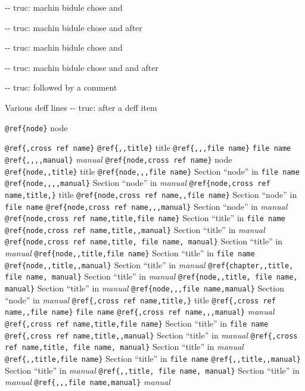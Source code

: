 \documentclass{book}
\begin{document}
\hbox{}{-}{-} truc: machin bidule chose and


%
\hbox{}{-}{-} truc: machin bidule chose and  after


%
\hbox{}{-}{-} truc: machin bidule chose and 


%
\hbox{}{-}{-} truc: machin bidule chose and and after


%
\hbox{}{-}{-} truc: followed by a comment


%
Various deff lines
\hbox{}{-}{-} truc: after a deff item


%

\texttt{@ref\{node\}} node

\texttt{@ref\{,cross ref name\}} 
\texttt{@ref\{,,title\}} title
\texttt{@ref\{,,,file name\}} \texttt{file name}
\texttt{@ref\{,,,,manual\}} \textit{manual}
\texttt{@ref\{node,cross ref name\}} node
\texttt{@ref\{node,,title\}} title
\texttt{@ref\{node,,,file name\}} Section ``node'' in \texttt{file name}
\texttt{@ref\{node,,,,manual\}} Section ``node'' in \textit{manual}
\texttt{@ref\{node,cross ref name,title,\}} title
\texttt{@ref\{node,cross ref name,,file name\}} Section ``node'' in \texttt{file name}
\texttt{@ref\{node,cross ref name,,,manual\}} Section ``node'' in \textit{manual}
\texttt{@ref\{node,cross ref name,title,file name\}} Section ``title'' in \texttt{file name}
\texttt{@ref\{node,cross ref name,title,,manual\}} Section ``title'' in \textit{manual}
\texttt{@ref\{node,cross ref name,title, file name, manual\}} Section ``title'' in \textit{manual}
\texttt{@ref\{node,,title,file name\}} Section ``title'' in \texttt{file name}
\texttt{@ref\{node,,title,,manual\}} Section ``title'' in \textit{manual}
\texttt{@ref\{chapter,,title, file name, manual\}} Section ``title'' in \textit{manual}
\texttt{@ref\{node,,title, file name, manual\}} Section ``title'' in \textit{manual}
\texttt{@ref\{node,,,file name,manual\}} Section ``node'' in \textit{manual}
\texttt{@ref\{,cross ref name,title,\}} title
\texttt{@ref\{,cross ref name,,file name\}} \texttt{file name}
\texttt{@ref\{,cross ref name,,,manual\}} \textit{manual}
\texttt{@ref\{,cross ref name,title,file name\}} Section ``title'' in \texttt{file name}
\texttt{@ref\{,cross ref name,title,,manual\}} Section ``title'' in \textit{manual}
\texttt{@ref\{,cross ref name,title, file name, manual\}} Section ``title'' in \textit{manual}
\texttt{@ref\{,,title,file name\}} Section ``title'' in \texttt{file name}
\texttt{@ref\{,,title,,manual\}} Section ``title'' in \textit{manual}
\texttt{@ref\{,,title, file name, manual\}} Section ``title'' in \textit{manual}
\texttt{@ref\{,,,file name,manual\}} \textit{manual}
\end{document}
